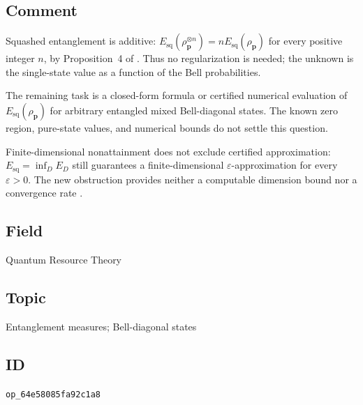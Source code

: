 \subsection*{Comment}

Squashed entanglement is additive:
$E_{\mathrm{sq}}(\rho_{\mathbf p}^{\otimes n})
=nE_{\mathrm{sq}}(\rho_{\mathbf p})$ for every positive integer $n$,
by Proposition~4 of .
Thus no regularization is needed; the unknown is the single-state value
as a function of the Bell probabilities.

The remaining task is a closed-form formula or certified numerical
evaluation of $E_{\mathrm{sq}}(\rho_{\mathbf p})$ for arbitrary entangled
mixed Bell-diagonal states.  The known zero region, pure-state values,
and numerical bounds do not settle this question.

Finite-dimensional nonattainment does not exclude certified approximation:
$E_{\mathrm{sq}}=\inf_D E_D$ still guarantees a finite-dimensional
$\varepsilon$-approximation for every $\varepsilon>0$.  The new obstruction
provides neither a computable dimension bound nor a convergence rate
.

\subsection*{Field}

Quantum Resource Theory

\subsection*{Topic}

Entanglement measures; Bell-diagonal states

\subsection*{ID}

\texttt{op\_64e58085fa92c1a8}
